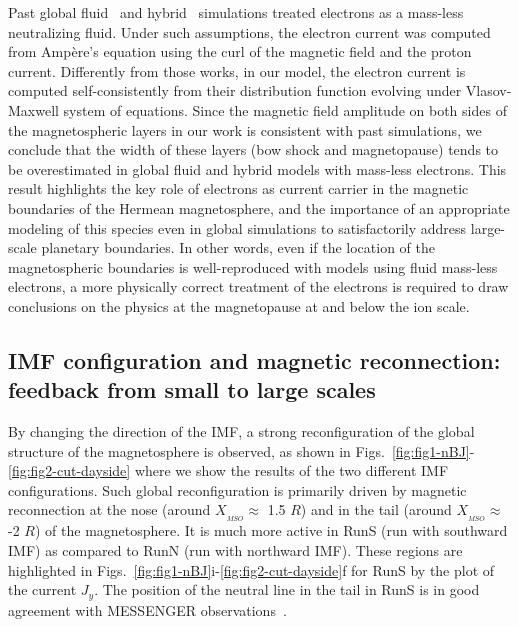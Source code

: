 \documentclass{aa}
\begin{document}
Past global fluid~\citep{Benna2010,Aizawa2021} and hybrid~\citep{Janhunen2004,Exner2020,Aizawa2021} simulations treated electrons as a mass-less neutralizing fluid. Under such assumptions, the electron current was computed from Amp\`ere's equation using the curl of the magnetic field and the proton current. Differently from those works, in our model, the electron current is computed self-consistently from their distribution function evolving under Vlasov-Maxwell system of equations.
Since the magnetic field amplitude on both sides of the magnetospheric layers in our work is consistent with past simulations, we conclude that the width of these layers (bow shock and magnetopause) tends to be overestimated in global fluid and hybrid models with mass-less electrons. This result highlights the key role of electrons as current carrier in the magnetic boundaries of the Hermean magnetosphere, and the importance of an appropriate modeling of this species even in global simulations to satisfactorily address large-scale planetary boundaries. In other words, even if the location of the magnetospheric boundaries is well-reproduced with models using fluid mass-less electrons, a more physically correct treatment of the electrons is required to draw conclusions on the physics at the magnetopause at and below the ion scale.

\subsection{IMF configuration and magnetic reconnection: feedback from small to large scales}

By changing the direction of the IMF, a strong reconfiguration of the global structure of the magnetosphere is observed, as shown in Figs.~\ref{fig:fig1-nBJ}-\ref{fig:fig2-cut-dayside} where we show the results of the two different IMF configurations. Such global reconfiguration is primarily driven by magnetic reconnection at the nose (around $X_{_{MSO}}\approx$ 1.5 $R$) and in the tail (around $X_{_{MSO}}\approx$ -2 $R$) of the magnetosphere. It is much more active in RunS (run with southward IMF) as compared to RunN (run with northward IMF). These regions are highlighted in Figs.~\ref{fig:fig1-nBJ}i-\ref{fig:fig2-cut-dayside}f for RunS by the plot of the current $J_y$. The position of the neutral line in the tail in RunS is in good agreement with MESSENGER observations~\citep{Poh2017}.
\end{document}
